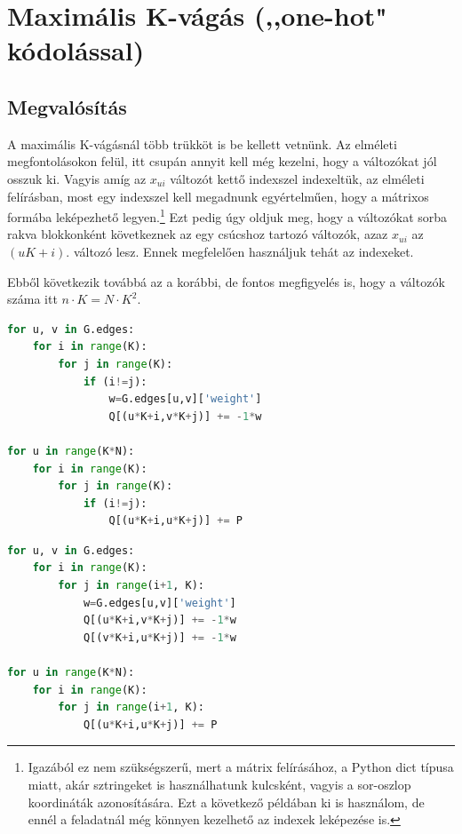 \section{Maximális K-vágás (,,one-hot" kódolással)}\label{sec:practiceOneHot}

\subsection{Megvalósítás}

A maximális K-vágásnál több trükköt is be kellett vetnünk. Az elméleti megfontolásokon felül, itt csupán annyit kell még kezelni, hogy a változókat jól osszuk ki. Vagyis amíg az $x_{ui}$ változót kettő indexszel indexeltük, az elméleti felírásban, most egy indexszel kell megadnunk egyértelműen, hogy a mátrixos formába leképezhető legyen.\footnote{Igazából ez nem szükségszerű, mert a mátrix felírásához, a Python dict típusa miatt, akár sztringeket is használhatunk kulcsként, vagyis a sor-oszlop koordináták azonosítására. Ezt a következő példában ki is használom, de ennél a feladatnál még könnyen kezelhető az indexek leképezése is.}
Ezt pedig úgy oldjuk meg, hogy a változókat sorba rakva blokkonként következnek az egy csúcshoz tartozó változók, azaz $x_{ui}$ az $(uK+i)$. változó lesz. Ennek megfelelően használjuk tehát az indexeket.

Ebből következik továbbá az a korábbi, de fontos megfigyelés is, hogy a változók száma itt $n \cdot K = N \cdot K^2$.

\vspace{5pt}
\begin{lstlisting}[language=python,caption=Maximális K-vágás QUBO (szimmetrikus mátrix), label=code:maxKCutQUBOSymmetric]
for u, v in G.edges:
	for i in range(K):
		for j in range(K):
			if (i!=j):
				w=G.edges[u,v]['weight']
				Q[(u*K+i,v*K+j)] += -1*w

for u in range(K*N):
	for i in range(K):
		for j in range(K):
			if (i!=j):
				Q[(u*K+i,u*K+j)] += P 
\end{lstlisting}

\vspace{5pt}
\begin{lstlisting}[language=python,caption=Maximális K-vágás QUBO (háromszög mátrix),label=code:maxKCutQUBOTriangle]
for u, v in G.edges:
	for i in range(K):
		for j in range(i+1, K):
			w=G.edges[u,v]['weight']
			Q[(u*K+i,v*K+j)] += -1*w
			Q[(v*K+i,u*K+j)] += -1*w

for u in range(K*N):
	for i in range(K):
		for j in range(i+1, K):
			Q[(u*K+i,u*K+j)] += P
\end{lstlisting}


